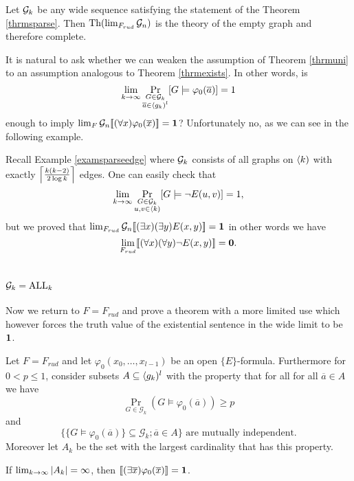 \begin{crll}\label{crlltoosparse}
Let $\mathcal{G}_k$ be any wide sequence satisfying the statement of the Theorem \ref{thrmsparse}. Then $\text{Th}(\lim_{F_{rud}}\mathcal{G}_n)$ is the theory of the empty graph and therefore complete. 
\end{crll}

It is natural to ask whether we can weaken the assumption of Theorem \ref{thrmuni} to an assumption analogous to Theorem \ref{thrmexists}. In other words, is
\[\lim_{k\to\infty}\Pr_{\substack{G\in\mathcal{G}_k\\\overline a\in \langle g_k)^l}}[G\models\varphi_0(\overline a)]=1\]
enough to imply $\lim_F\mathcal{G}_n[\![(\forall x)\varphi_0(\overline x)]\!]=\textbf{1}$? Unfortunately no, as we can see in the following example.

\begin{exam}Recall Example \ref{examsparseedge} where $\mathcal{G}_k$ consists of all graphs on $\langle k)$ with exactly $\left \lceil {\frac{k(k-2)}{2\log k}} \right \rceil$ edges. One can easily check that
\[\lim_{k\to\infty}\Pr_{\substack{G\in\mathcal{G}_k\\u,v \in \langle k)}}[G\models \lnot E(u,v)]=1,\]
but we proved that $\lim_{F_{rud}}\mathcal{G}_n [\![(\exists x)(\exists y)E(x,y)]\!]=\textbf{1}$ in other words we have \[\lim_{F_{rud}}[\![(\forall x)(\forall y)\lnot E(x,y)]\!]=\textbf{0}.\]
\end{exam}

\section{\texorpdfstring{$\mathcal{G}_k=\text{ALL}_k$}{Gk=ALLk}}

Now we return to $F=F_{rud}$ and prove a theorem with a more limited use which however forces the truth value of the existential sentence in the wide limit to be $\textbf{1}$.

\begin{thrm}\label{mutindfind}
Let $F=F_{rud}$ and let $\varphi_0(x_0,\dots,x_{l-1})$ be an open $\{E\}$-formula. Furthermore for $0<p\leq 1$, consider subsets $A\subseteq\langle g_k)^l$ with the property that for all for all $\overline a \in A$ we have
\[\Pr_{G\in\mathcal{G}_k}(G\models \varphi_0(\overline a))\geq p\]
and
\[\text{$\{\{G\models\varphi_0(\overline a)\}\subseteq \mathcal{G}_k;\overline a \in A\}$ are mutually independent.}\]
Moreover let $A_k$ be the set with the largest cardinality that has this property.

If $\lim_{k\to\infty} \left|{A_k}\right|=\infty$, then $[\![(\exists \overline x)\varphi_0(\overline x)]\!]=\textbf{1}$.
\end{thrm}

